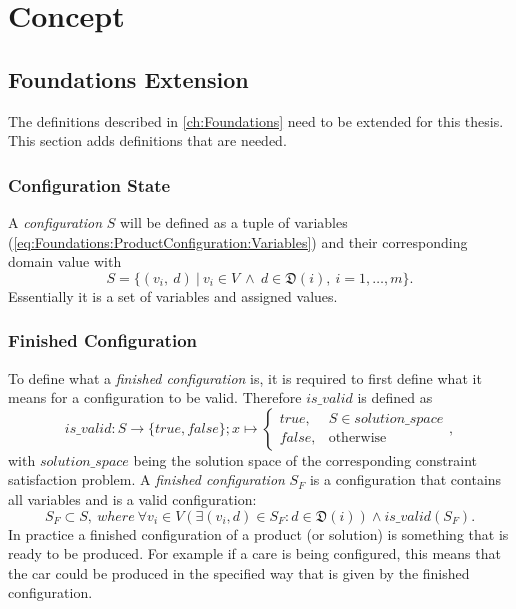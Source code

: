 \chapter{Concept}
\label{ch:Concept}

\section{Foundations Extension}
\label{sec:Concept:Requirements}

The definitions described in \autoref{ch:Foundations} need to be extended for this thesis. This section adds definitions that are needed.

\subsection{Configuration State}

A \emph{configuration} $S$ will be defined as a tuple of variables (\autoref{eq:Foundations:ProductConfiguration:Variables}) and their corresponding domain value with
\begin{equation} \label{eq:Foundations:ProductConfiguration:ConfigurationState}
    S = \{ (v_i,\ d) \ |\ v_i \in V \ \land \ d \in \mathfrak{D}(i),\ i=1,\dotsc,m \}.
\end{equation}
Essentially it is a set of variables and assigned values.

\subsection{Finished Configuration}
To define what a \emph{finished configuration} is, it is required to first define what it means for a configuration to be valid. Therefore $is\_valid$ is defined as
\begin{equation} \label{eq:Foundations:ProductConfiguration:IsValid}
    is\_valid : S \to \{true, false\}; x \mapsto 
    \begin{cases}
        true, & S \in solution\_space \\
        false, & \text{otherwise}
    \end{cases},
\end{equation}
with $solution\_space$ being the solution space of the corresponding constraint satisfaction problem. A \emph{finished configuration} $S_F$ is a configuration that contains all variables and is a valid configuration:
\begin{equation} \label{eq:Foundations:ProductConfiguration:FinishedConfiguration}
    S_F \subset S,\ where \ \forall v_i \in V (\exists (v_i, d) \in S_F : d \in \mathfrak{D}(i)) \land is\_valid(S_F).
\end{equation}
In practice a finished configuration of a product (or solution) is something that is ready to be produced. For example if a care is being configured, this means that the car could be produced in the specified way that is given by the finished configuration.



